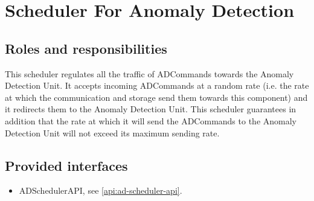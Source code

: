 \section{Scheduler For Anomaly Detection}
\label{element:scheduler-ad}

\subsection{Roles and responsibilities}

\npar This scheduler regulates all the traffic of ADCommands towards the
Anomaly Detection Unit. It accepts incoming ADCommands at a random rate (i.e.
the rate at which the communication and storage send them towards this
component) and it redirects them to the Anomaly Detection Unit. This
scheduler guarantees in addition that the rate at which it will send the
ADCommands to the Anomaly Detection Unit will not exceed its maximum sending
rate.

\subsection{Provided interfaces}

\begin{itemize}
  \item ADSchedulerAPI, see \ref{api:ad-scheduler-api}.
\end{itemize}



